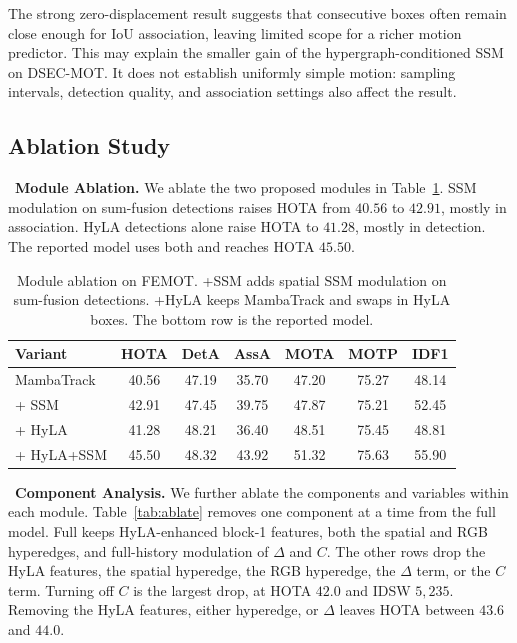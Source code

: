 \documentclass[10pt,twocolumn,letterpaper]{article}
\begin{document}
The strong zero-displacement result suggests that consecutive boxes often remain close enough for IoU association, leaving limited scope for a richer motion predictor. This may explain the smaller gain of the hypergraph-conditioned SSM on DSEC-MOT. It does not establish uniformly simple motion: sampling intervals, detection quality, and association settings also affect the result.



\subsection{Ablation Study}

\noindent\textbullet~\textbf{Module Ablation.} We ablate the two proposed modules in Table~\ref{tab:modules}. SSM modulation on sum-fusion detections raises HOTA from $40.56$ to $42.91$, mostly in association. HyLA detections alone raise HOTA to $41.28$, mostly in detection. The reported model uses both and reaches HOTA $45.50$.

\begin{table}
  \centering
  \footnotesize
  \setlength{\tabcolsep}{2.2pt}
  \caption{Module ablation on FEMOT. +SSM adds spatial SSM modulation on sum-fusion detections. +HyLA keeps MambaTrack and swaps in HyLA boxes. The bottom row is the reported model.}
  \label{tab:modules}
  \begin{tabular*}{\columnwidth}{@{\extracolsep{\fill}}lcccccc@{}}
    \toprule
    Variant & HOTA & DetA & AssA & MOTA & MOTP & IDF1 \\
    \midrule
    MambaTrack & 40.56 & 47.19 & 35.70 & 47.20 & 75.27 & 48.14 \\
    + SSM & 42.91 & 47.45 & 39.75 & 47.87 & 75.21 & 52.45 \\
    + HyLA & 41.28 & 48.21 & 36.40 & 48.51 & 75.45 & 48.81 \\
    \rowcolor{oursrow}
    + HyLA+SSM & 45.50 & 48.32 & 43.92 & 51.32 & 75.63 & 55.90 \\
    \bottomrule
  \end{tabular*}
\end{table}

\noindent\textbullet~\textbf{Component Analysis.} We further ablate the components and variables within each module. Table~\ref{tab:ablate} removes one component at a time from the full model. Full keeps HyLA-enhanced block-1 features, both the spatial and RGB hyperedges, and full-history modulation of $\Delta$ and $C$. The other rows drop the HyLA features, the spatial hyperedge, the RGB hyperedge, the $\Delta$ term, or the $C$ term. Turning off $C$ is the largest drop, at HOTA $42.0$ and IDSW $5{,}235$. Removing the HyLA features, either hyperedge, or $\Delta$ leaves HOTA between $43.6$ and $44.0$.
\end{document}
